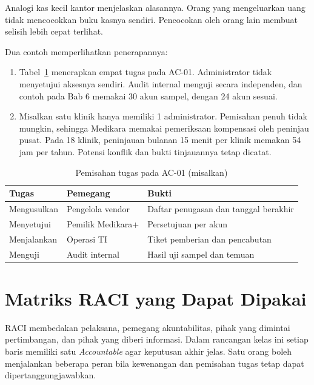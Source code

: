 Analogi kas kecil kantor menjelaskan alasannya. Orang yang mengeluarkan uang tidak mencocokkan
buku kasnya sendiri. Pencocokan oleh orang lain membuat selisih lebih cepat terlihat.

Dua contoh memperlihatkan penerapannya:
\begin{enumerate}
  \item Tabel~\ref{tab:ch08-pemisahan} menerapkan empat tugas pada AC-01. Administrator tidak
  menyetujui aksesnya sendiri. Audit internal menguji secara independen, dan contoh pada Bab 6
  memakai 30 akun sampel, dengan 24 akun sesuai.
  \item Misalkan satu klinik hanya memiliki 1 administrator. Pemisahan penuh tidak mungkin,
  sehingga Medikara memakai pemeriksaan kompensasi oleh peninjau pusat. Pada 18 klinik, peninjauan
  bulanan 15 menit per klinik memakan 54 jam per tahun. Potensi konflik dan bukti tinjauannya
  tetap dicatat.
\end{enumerate}

\begin{table}[!htb]
  \centering\small
  \caption{Pemisahan tugas pada AC-01 (misalkan)}\label{tab:ch08-pemisahan}
  \begin{tabularx}{\textwidth}{|>{\raggedright\arraybackslash}p{}|>{\raggedright\arraybackslash}p{}|>{\raggedright\arraybackslash}X|}
    \hline
    \textbf{Tugas} & \textbf{Pemegang} & \textbf{Bukti} \\ \hline
    Mengusulkan & Pengelola vendor & Daftar penugasan dan tanggal berakhir \\ \hline
    Menyetujui & Pemilik Medikara+ & Persetujuan per akun \\ \hline
    Menjalankan & Operasi TI & Tiket pemberian dan pencabutan \\ \hline
    Menguji & Audit internal & Hasil uji sampel dan temuan \\ \hline
  \end{tabularx}
\end{table}

\section{Matriks RACI yang Dapat Dipakai}

RACI membedakan pelaksana, pemegang akuntabilitas, pihak yang dimintai pertimbangan, dan pihak
yang diberi informasi. Dalam rancangan kelas ini setiap baris memiliki satu \textit{Accountable}
agar keputusan akhir jelas. Satu orang boleh menjalankan beberapa peran bila kewenangan dan
pemisahan tugas tetap dapat dipertanggungjawabkan.

